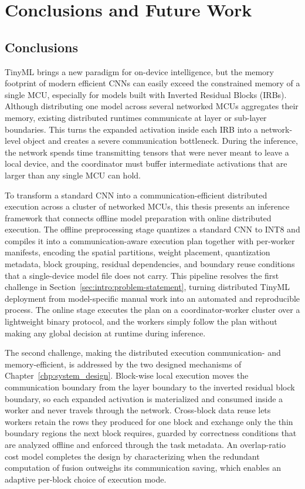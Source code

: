 \chapter{Conclusions and Future Work}
\label{chp:conclusions}

\section{Conclusions}
\label{sec:conclusions}

TinyML brings a new paradigm for on-device intelligence, but the memory footprint of modern efficient CNNs can easily exceed the constrained memory of a single MCU, especially for models built with Inverted Residual Blocks (IRBs). 
Although distributing one model across several networked MCUs aggregates their memory, existing distributed runtimes communicate at layer or sub-layer boundaries.
This turns the expanded activation inside each IRB into a network-level object and creates a severe communication bottleneck.
During the inference, the network spends time transmitting tensors that were never meant to leave a local device, and the coordinator must buffer intermediate activations that are larger than any single MCU can hold.

To transform a standard CNN into a communication-efficient distributed execution across a cluster of networked MCUs, this thesis presents an inference framework that connects offline model preparation with online distributed execution.
The offline preprocessing stage quantizes a standard CNN to INT8 and compiles it into a communication-aware execution plan together with per-worker manifests, encoding the spatial partitions, weight placement, quantization metadata, block grouping, residual dependencies, and boundary reuse conditions that a single-device model file does not carry.
This pipeline resolves the first challenge in Section~\ref{sec:intro:problem-statement}, turning distributed TinyML deployment from model-specific manual work into an automated and reproducible process.
The online stage executes the plan on a coordinator-worker cluster over a lightweight binary protocol, and the workers simply follow the plan without making any global decision at runtime during inference.

The second challenge, making the distributed execution communication- and memory-efficient, is addressed by the two designed mechanisms of Chapter~\ref{chp:system_design}.
Block-wise local execution moves the communication boundary from the layer boundary to the inverted residual block boundary, so each expanded activation is materialized and consumed inside a worker and never travels through the network.
Cross-block data reuse lets workers retain the rows they produced for one block and exchange only the thin boundary regions the next block requires, guarded by correctness conditions that are analyzed offline and enforced through the task metadata.
An overlap-ratio cost model completes the design by characterizing when the redundant computation of fusion outweighs its communication saving, which enables an adaptive per-block choice of execution mode.

